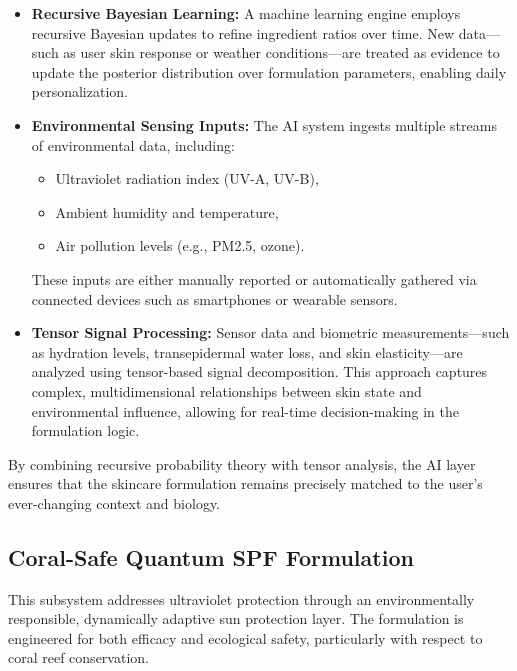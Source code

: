 \documentclass{article}
\theoremstyle{plain}
\theoremstyle{claimstyle}
\begin{document}
\begin{itemize}
    \item \textbf{Recursive Bayesian Learning:} A machine learning engine employs recursive Bayesian updates to refine ingredient ratios over time. New data—such as user skin response or weather conditions—are treated as evidence to update the posterior distribution over formulation parameters, enabling daily personalization.

    \item \textbf{Environmental Sensing Inputs:} The AI system ingests multiple streams of environmental data, including:
    \begin{itemize}
        \item Ultraviolet radiation index (UV-A, UV-B),
        \item Ambient humidity and temperature,
        \item Air pollution levels (e.g., PM2.5, ozone).
    \end{itemize}
    These inputs are either manually reported or automatically gathered via connected devices such as smartphones or wearable sensors.

    \item \textbf{Tensor Signal Processing:} Sensor data and biometric measurements—such as hydration levels, transepidermal water loss, and skin elasticity—are analyzed using tensor-based signal decomposition. This approach captures complex, multidimensional relationships between skin state and environmental influence, allowing for real-time decision-making in the formulation logic.
\end{itemize}

By combining recursive probability theory with tensor analysis, the AI layer ensures that the skincare formulation remains precisely matched to the user’s ever-changing context and biology.
\subsection{Coral-Safe Quantum SPF Formulation}

This subsystem addresses ultraviolet protection through an environmentally responsible, dynamically adaptive sun protection layer. The formulation is engineered for both efficacy and ecological safety, particularly with respect to coral reef conservation.
\end{document}

